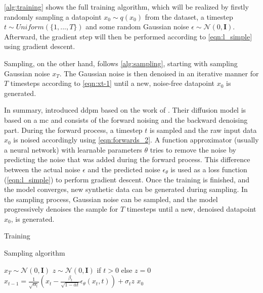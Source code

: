 \autoref{alg:training} shows the full training algorithm, which will be realized by firstly randomly sampling a datapoint $x_0 \sim q(x_0)$ from the dataset, a timestep $t\sim Uniform(\{1, ..., T\})$ and some random Gaussian noise $\epsilon \sim \mathcal{N}(0, \textbf{I})$.
Afterward, the gradient step will then be performed according to \autoref{eqn:l_simple} using gradient descent.

Sampling, on the other hand, follows \autoref{alg:sampling}, starting with sampling Gaussian noise $x_T$.
The Gaussian noise is then denoised in an iterative manner for $T$ timesteps according to \autoref{eqn:xt-1} until a new, noise-free datapoint $x_0$ is generated.

In summary, \cite{ho2020DenoisingDiffusionProbabilistic} introduced \gls{ddpm} based on the work of \cite{sohl-dickstein2015DeepUnsupervisedLearning}.
Their diffusion model is based on a \gls{mc} and consists of the forward noising and the backward denoising part.
During the forward process, a timestep $t$ is sampled and the raw input data $x_0$ is noised accordingly using \autoref{eqn:forwards_2}.
A function approximator (usually a neural network) with learnable parameters $\theta$ tries to remove the noise by predicting the noise that was added during the forward process.
This difference between the actual noise $\epsilon$ and the predicted noise $\epsilon_{\theta}$ is used as a loss function (\autoref{eqn:l_simple}) to perform gradient descent.
Once the training is finished, and the model converges, new synthetic data can be generated during sampling.
In the sampling process, Gaussian noise can be sampled, and the model progressively denoises the sample for $T$ timesteps until a new, denoised datapoint $x_0$, is generated.

\begin{algorithm}[H]
  \caption[Training algorithm]{Training \cite[p. 4]{ho2020DenoisingDiffusionProbabilistic}}
  \label{alg:training}
\end{algorithm}

\begin{algorithm}[H]
  \caption[Sampling algorithm]{Sampling algorithm \cite[p. 4]{ho2020DenoisingDiffusionProbabilistic}}
  \label{alg:sampling}
  \begin{algorithmic}
  \State $x_T \sim \mathcal{N}(0, \mathbf{I})$
  \State $z \sim \mathcal{N}(0, \mathbf{I})$ if $t > 0$ else $z = 0$
  \State $x_{t-1} = \frac{1}{\sqrt{\alpha_t}}\left(x_t - \frac{\beta_t}{\sqrt{1-\bar{\alpha}t}}\epsilon_{\theta}(x_t,t)\right) + \sigma_t z$
  \EndFor
  \State \Return $x_0$
  \end{algorithmic}
\end{algorithm}


